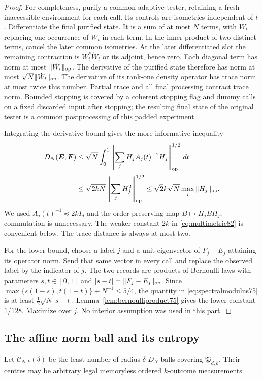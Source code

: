 \begin{proof}
For completeness, purify a common adaptive tester, retaining a fresh
inaccessible environment for each call.  Its controls are isometries
independent of $t$.  Differentiate the final purified state.  It is a
sum of at most $N$ terms, with $\dot W_t$ replacing one occurrence
of $W_t$ in each term.  In the inner product of two distinct terms,
cancel the later common isometries.  At the later differentiated
slot the remaining contraction is $W_t^*\dot W_t$ or its adjoint,
hence zero.  Each diagonal term has norm at most
$\|\dot W_t\|_{\rm op}$.  The derivative of the purified state
therefore has norm at most $\sqrt N\|\dot W_t\|_{\rm op}$.
The derivative of its rank-one density operator has trace norm at
most twice this number.  Partial trace and all final processing
contract trace norm.  Bounded stopping is covered by a coherent
stopping flag and dummy calls on a fixed discarded input after
stopping; the resulting final state of the original tester is a
common postprocessing of this padded experiment.

Integrating the derivative bound gives the more informative inequality
\begin{align}\label{eq:multipath82}
 D_N(\boldsymbol E,\boldsymbol F)
 &\le \sqrt N\int_0^1
       \left\|\sum_jH_jA_j(t)^{-1}H_j\right\|_{\rm op}^{1/2}\,dt\\
 &\le\sqrt{2kN}\left\|\sum_jH_j^2\right\|_{\rm op}^{1/2}
 \le\sqrt2 k\sqrt N\max_j\|H_j\|_{\rm op}.\notag
\end{align}
We used $A_j(t)^{-1}\preceq2kI_d$ and the order-preserving map
$B\mapsto H_jBH_j$; commutation is unnecessary.  The weaker
constant $2k$ in \eqref{eq:multimetric82} is convenient below.
The trace distance is always at most two.

For the lower bound, choose a label $j$ and a unit eigenvector of
$F_j-E_j$ attaining its operator norm.  Send that same vector in
every call and replace the observed label by the indicator of $j$.
The two records are products of Bernoulli laws with parameters
$s,t\in[0,1]$ and $|s-t|=\|F_j-E_j\|_{\rm op}$.  Since
$\max\{s(1-s),t(1-t)\}+N^{-1}\le5/4$, the quantity in
\eqref{eq:spectralmodulus75} is at least
$\tfrac12\sqrt N|s-t|$.
Lemma~\ref{lem:bernoulliproduct75} gives the lower constant $1/128$.
Maximize over $j$.  No interior assumption was used in this part.
\end{proof}

\subsection{The affine norm ball and its entropy}
Let $\mathcal C_{N,k}(\delta)$ be the least number of radius-$\delta$
$D_N$-balls covering $\mathfrak P_{d,k}$.  Their centres may be
arbitrary legal memoryless ordered $k$-outcome measurements.

